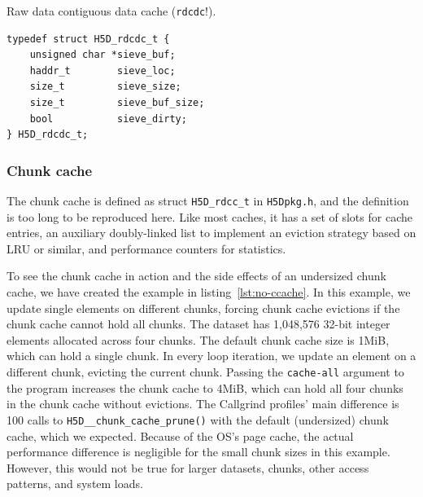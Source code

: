 \begin{listing}
\centering
\caption{Raw data contiguous data cache (\texttt{rdcdc}!).}
\label{lst:rdcdc}
\begin{verbatim}
typedef struct H5D_rdcdc_t {
    unsigned char *sieve_buf;
    haddr_t        sieve_loc;
    size_t         sieve_size;
    size_t         sieve_buf_size;
    bool           sieve_dirty;
} H5D_rdcdc_t;
\end{verbatim}
\end{listing}

\subsubsection{Chunk cache}

The chunk cache is defined as struct \texttt{H5D\_rdcc\_t} in \texttt{H5Dpkg.h}, and the definition is too long to be reproduced here. Like most caches, it has a set of slots for cache entries, an auxiliary doubly-linked list to implement an eviction strategy based on LRU or similar, and performance counters for statistics.

To see the chunk cache in action and the side effects of an undersized chunk cache, we have created the example in listing~\ref{lst:no-ccache}. In this example, we update single elements on different chunks, forcing chunk cache evictions if the chunk cache cannot hold all chunks. The dataset has 1,048,576 32-bit integer elements allocated across four chunks. The default chunk cache size is 1MiB, which can hold a single chunk. In every loop iteration, we update an element on a different chunk, evicting the current chunk. Passing the \texttt{cache-all} argument to the program increases the chunk cache to 4MiB, which can hold all four chunks in the chunk cache without evictions. The Callgrind profiles' main difference is 100 calls to \texttt{H5D\_\_chunk\_cache\_prune()} with the default (undersized) chunk cache, which we expected. Because of the OS's page cache, the actual performance difference is negligible for the small chunk sizes in this example. However, this would not be true for larger datasets, chunks, other access patterns, and system loads.

